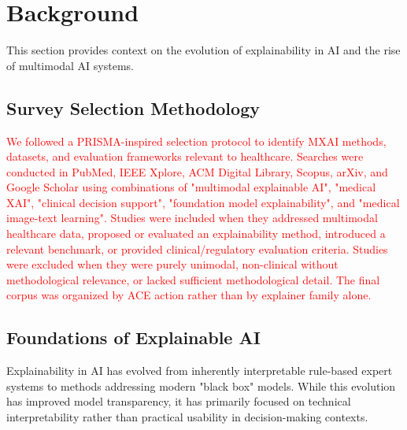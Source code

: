 \documentclass[pdflatex,sn-mathphys-num]{sn-jnl}%
\theoremstyle{thmstyleone}%
\theoremstyle{thmstyletwo}%
\theoremstyle{thmstylethree}%
\begin{document}

\section{Background}
This section provides context on the evolution of explainability in AI and the rise of multimodal AI systems.

\subsection{Survey Selection Methodology}
\textcolor{red}{
We followed a PRISMA-inspired selection protocol to identify MXAI methods, datasets, and evaluation frameworks relevant to healthcare. Searches were conducted in PubMed, IEEE Xplore, ACM Digital Library, Scopus, arXiv, and Google Scholar using combinations of "multimodal explainable AI", "medical XAI", "clinical decision support", "foundation model explainability", and "medical image-text learning". Studies were included when they addressed multimodal healthcare data, proposed or evaluated an explainability method, introduced a relevant benchmark, or provided clinical/regulatory evaluation criteria. Studies were excluded when they were purely unimodal, non-clinical without methodological relevance, or lacked sufficient methodological detail. The final corpus was organized by ACE action rather than by explainer family alone. }

\subsection{Foundations of Explainable AI}
Explainability in AI has evolved from inherently interpretable rule-based expert systems to methods addressing modern "black box" models. 
While this evolution has improved model transparency, it has primarily focused on technical interpretability rather than practical usability in decision-making contexts.
\end{document}
